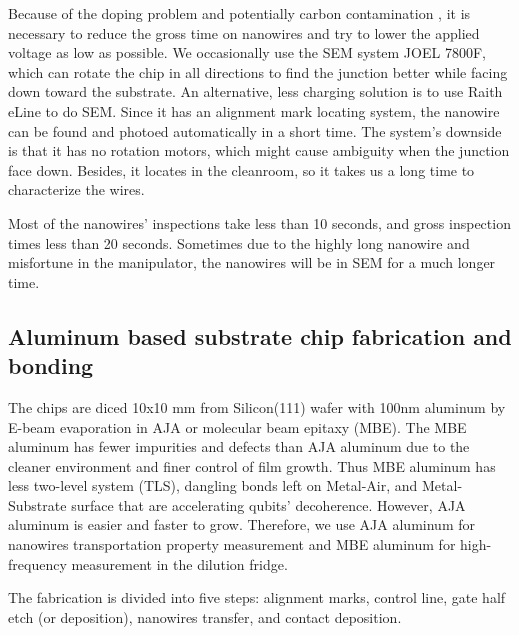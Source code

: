 Because of the doping problem and potentially carbon contamination \cite{RN41}, it is necessary to reduce the gross time on nanowires and try to lower the applied voltage as low as possible. We occasionally use the SEM system JOEL 7800F, which can rotate the chip in all directions to find the junction better while facing down toward the substrate. An alternative, less charging solution is to use Raith eLine to do SEM. Since it has an alignment mark locating system, the nanowire can be found and photoed automatically in a short time. The system's downside is that it has no rotation motors, which might cause ambiguity when the junction face down. Besides, it locates in the cleanroom, so it takes us a long time to characterize the wires.

Most of the nanowires' inspections take less than 10 seconds, and gross inspection times less than 20 seconds. Sometimes due to the highly long nanowire and misfortune in the manipulator, the nanowires will be in SEM for a much longer time. 


\subsection{Aluminum based substrate chip fabrication and bonding}
The chips are diced 10x10 mm from Silicon(111) wafer with 100nm aluminum by E-beam evaporation in AJA or molecular beam epitaxy (MBE). The MBE aluminum has fewer impurities and defects than AJA aluminum due to the cleaner environment and finer control of film growth. Thus MBE aluminum has less two-level system (TLS), dangling bonds left on Metal-Air, and Metal-Substrate surface that are accelerating qubits' decoherence. However, AJA aluminum is easier and faster to grow. Therefore, we use AJA aluminum for nanowires transportation property measurement and MBE aluminum for high-frequency measurement in the dilution fridge.

The fabrication is divided into five steps: alignment marks, control line, gate half etch (or deposition), nanowires transfer, and contact deposition.

